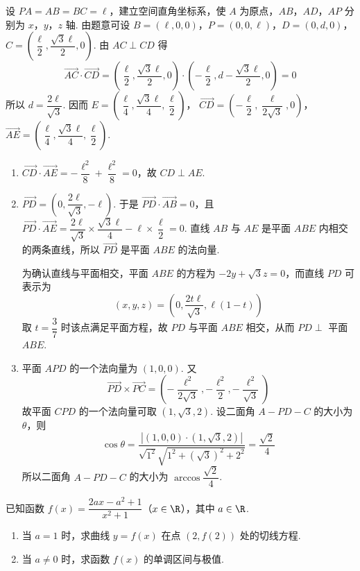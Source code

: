 \begin{solution}
设 \(PA=AB=BC=\ell\)，建立空间直角坐标系，使 \(A\) 为原点，\(AB\)，\(AD\)，\(AP\) 分别为 \(x\)，\(y\)，\(z\) 轴.
由题意可设 \(B=(\ell,0,0)\)，\(P=(0,0,\ell)\)，\(D=(0,d,0)\)，
\(C=\left(\dfrac{\ell}{2},\dfrac{\sqrt{3}\ell}{2},0\right)\).
由 \(AC\perp CD\) 得
\[
\overrightarrow{AC}\cdot\overrightarrow{CD}=\left(\dfrac{\ell}{2},\dfrac{\sqrt{3}\ell}{2},0\right)\cdot\left(-\dfrac{\ell}{2},d-\dfrac{\sqrt{3}\ell}{2},0\right)=0
\]
所以 \(d=\dfrac{2\ell}{\sqrt{3}}\). 因而 \(E=\left(\dfrac{\ell}{4},\dfrac{\sqrt{3}\ell}{4},\dfrac{\ell}{2}\right)\)，
\(\overrightarrow{CD}=\left(-\dfrac{\ell}{2},\dfrac{\ell}{2\sqrt{3}},0\right)\)，
\(\overrightarrow{AE}=\left(\dfrac{\ell}{4},\dfrac{\sqrt{3}\ell}{4},\dfrac{\ell}{2}\right)\).

\begin{enumerate}
\item \(\overrightarrow{CD}\cdot\overrightarrow{AE}=-\dfrac{\ell^2}{8}+\dfrac{\ell^2}{8}=0\)，故 \(CD\perp AE\).
\item \(\overrightarrow{PD}=\left(0,\dfrac{2\ell}{\sqrt{3}},-\ell\right)\). 于是 \(\overrightarrow{PD}\cdot\overrightarrow{AB}=0\)，且
\(\overrightarrow{PD}\cdot\overrightarrow{AE}=\dfrac{2\ell}{\sqrt{3}}\times\dfrac{\sqrt{3}\ell}{4}-\ell\times\dfrac{\ell}{2}=0\). 直线 \(AB\) 与 \(AE\) 是平面 \(ABE\) 内相交的两条直线，所以 \(\overrightarrow{PD}\) 是平面 \(ABE\) 的法向量.

为确认直线与平面相交，平面 \(ABE\) 的方程为 \(-2y+\sqrt{3}z=0\)，而直线 \(PD\) 可表示为
\[
(x,y,z)=\left(0,\dfrac{2t\ell}{\sqrt{3}},\ell(1-t)\right)
\]
取 \(t=\dfrac{3}{7}\) 时该点满足平面方程，故 \(PD\) 与平面 \(ABE\) 相交，从而 \(PD\perp\) 平面 \(ABE\).
\item 平面 \(APD\) 的一个法向量为 \((1,0,0)\). 又
\[
\overrightarrow{PD}\times\overrightarrow{PC}=\left(-\dfrac{\ell^2}{2\sqrt{3}},-\dfrac{\ell^2}{2},-\dfrac{\ell^2}{\sqrt{3}}\right)
\]
故平面 \(CPD\) 的一个法向量可取 \((1,\sqrt{3},2)\). 设二面角 \(A-PD-C\) 的大小为 \(\theta\)，则
\[
\cos\theta=\dfrac{|(1,0,0)\cdot(1,\sqrt{3},2)|}{\sqrt{1^2}\sqrt{1^2+(\sqrt{3})^2+2^2}}=\dfrac{\sqrt{2}}{4}
\]
所以二面角 \(A-PD-C\) 的大小为 \(\arccos\dfrac{\sqrt{2}}{4}\).
\end{enumerate}
\end{solution}

\begin{problem}
已知函数 \(f(x) = \dfrac{2ax - a^2 + 1}{x^2 + 1}\)（\(x \in \R\)），其中 \(a \in \R\).

\begin{enumerate}
\item 当 \(a = 1\) 时，求曲线 \(y = f(x)\) 在点 \((2, f(2))\) 处的切线方程.
\item 当 \(a \neq 0\) 时，求函数 \(f(x)\) 的单调区间与极值.
\end{enumerate}
\end{problem}


